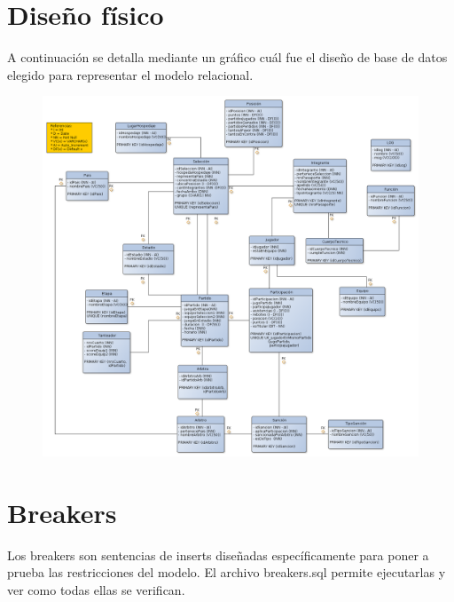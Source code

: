 \documentclass[11pt, a4paper, spanish]{article}
\begin{document}
{{{\newpage 
\section{Dise\~{n}o f\'isico}

A continuaci\'on se detalla mediante un gr\'afico cu\'al fue el dise\~{n}o de base de datos elegido para representar el modelo relacional.

 
\begin{figure}[hb]
  \centering
  \includegraphics[scale=0.37]{diagramas/DiagramaFisico.png}\\
\end{figure}




\newpage 
\section{Breakers}

Los breakers son sentencias de inserts dise\~{n}adas espec\'ificamente para poner a prueba las restricciones del modelo.
El archivo breakers.sql permite ejecutarlas y ver como todas ellas se verifican.

}}}
\end{document}
